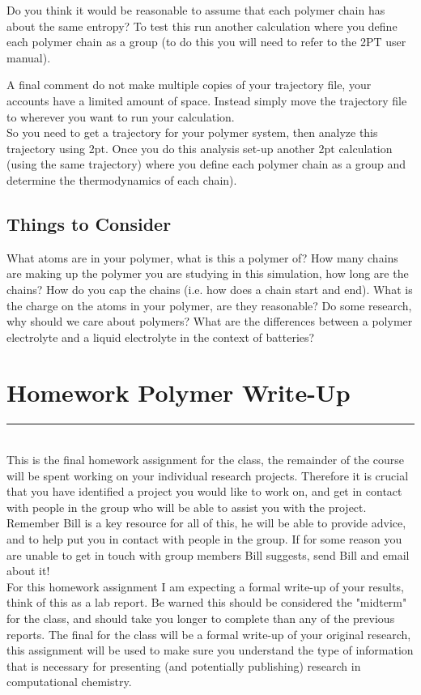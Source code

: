 \documentclass{article}
\begin{document}
Do you think it would be reasonable to assume that each polymer chain has about the same entropy?
To test this run another calculation where you define each polymer chain as a group (to do this you will need to refer to the 2PT user manual). 

A final comment do not make multiple copies of your trajectory file, your accounts have a limited amount of space.
Instead simply move the trajectory file to wherever you want to run your calculation. \\

So you need to get a trajectory for your polymer system, then analyze this trajectory using 2pt.
Once you do this analysis set-up another 2pt calculation (using the same trajectory) where you define each polymer chain as a group and determine the thermodynamics of each chain). 

\subsection*{Things to Consider}
What atoms are in your polymer, what is this a polymer of?
How many chains are making up the polymer you are studying in this simulation, how long are the chains?
How do you cap the chains (i.e. how does a chain start and end).
What is the charge on the atoms in your polymer, are they reasonable?
Do some research, why should we care about polymers?
What are the differences between a polymer electrolyte and a liquid electrolyte in the context of batteries?

\section{Homework Polymer Write-Up}
\noindent\rule[0.5ex]{\linewidth}{1pt}\\

This is the final homework assignment for the class, the remainder of the course will be spent working on your individual research projects.
Therefore it is crucial that you have identified a project you would like to work on, and get in contact with people in the group who will be able to assist you with the project. 
Remember Bill is a key resource for all of this, he will be able to provide advice, and to help put you in contact with people in the group.
If for some reason you are unable to get in touch with group members Bill suggests, send Bill and email about it!\\

For this homework assignment I am expecting a formal write-up of your results, think of this as a lab report. 
Be warned this should be considered the "midterm" for the class, and should take you longer to complete than any of the previous reports.
The final for the class will be a formal write-up of your original research, this assignment will be used to make sure you understand the type of information that is necessary for presenting (and potentially publishing) research in computational chemistry. 
\end{document}

